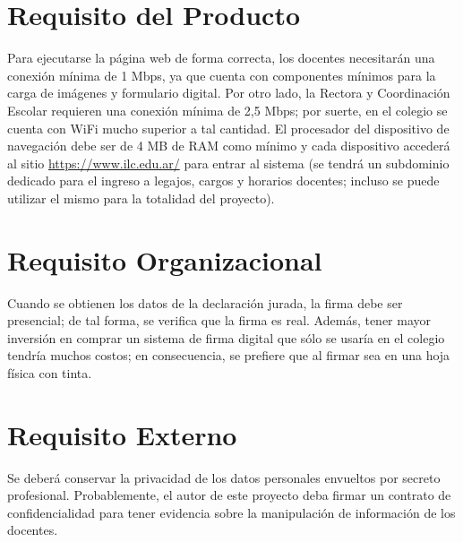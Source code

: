 \section{Requisito del Producto}
\normalsize{ \indent
Para ejecutarse la página web de forma correcta, los docentes
necesitarán una conexión mínima de 1 Mbps, ya que cuenta con
componentes mínimos para la carga de imágenes y formulario
digital. Por otro lado, la Rectora y Coordinación Escolar
requieren una conexión mínima de 2,5 Mbps; por suerte, en el
colegio se cuenta con WiFi mucho superior a tal cantidad. El
procesador del dispositivo de navegación debe ser de 4 MB de
RAM como mínimo y cada dispositivo accederá al sitio
\url{https://www.ilc.edu.ar/}
para entrar al sistema (se tendrá un subdominio dedicado para
el ingreso a legajos, cargos y horarios docentes; incluso se
puede utilizar el mismo para la totalidad del proyecto).
}
\section{Requisito Organizacional}
\normalsize{ \indent
Cuando se obtienen los datos de la declaración jurada, la firma
debe ser presencial; de tal forma, se verifica que la firma es
real. Además, tener mayor inversión en comprar un sistema de
firma digital que sólo se usaría en el colegio tendría muchos
costos; en consecuencia, se prefiere que al firmar sea en una
hoja física con tinta.
}
\section{Requisito Externo}
\normalsize{ \indent
Se deberá conservar la privacidad de los datos personales
envueltos por secreto profesional. Probablemente, el autor de
este proyecto deba firmar un contrato de confidencialidad para
tener evidencia sobre la manipulación de información de los
docentes.
}
